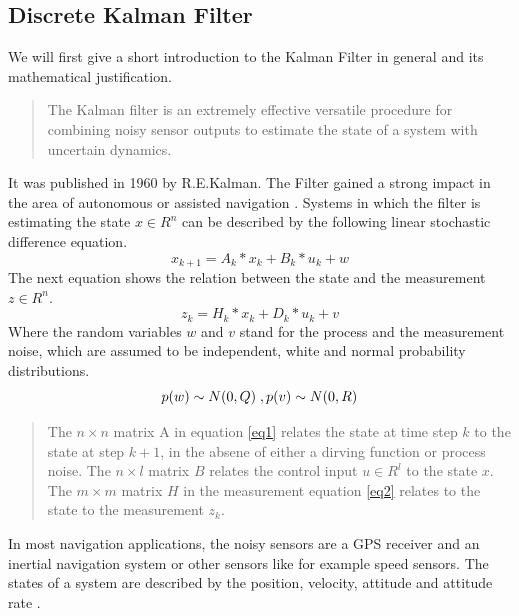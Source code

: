 \subsection*{Discrete Kalman Filter}
We will first give a short introduction to the Kalman Filter in general and its mathematical justification.
\begin{quote}The Kalman filter is an extremely effective versatile procedure for combining noisy sensor outputs to estimate the state of a system with uncertain dynamics.\cite{andrews2007}\end{quote} It was published in 1960 by R.E.Kalman. The Filter gained a strong impact in the area of autonomous or assisted navigation \cite{welch1997}. 
Systems in which the filter is estimating the state $x \in R^{n}$ can be described by the following linear stochastic difference equation.
\begin{equation}
x_{k+1}=A_k*x_k+B_k*u_k+w
\label{eq1}
\end{equation} The next equation shows the relation between the state and the measurement $z \in R^{n}$.
\begin{equation} 
z_k=H_k*x_k+D_k*u_k+v
\label{eq2}
\end{equation}
Where the random variables $w$ and $v$ stand for the process and the measurement noise, which are assumed to be independent, white and normal probability distributions.
\begin{equation}
p(w)\sim N(0,Q)\;, \\
p(v)\sim N(0,R)\label{R_Q_noise}
\end{equation}
\begin{quote}The $n\times n$ matrix A in equation \ref{eq1} relates the state at time step $k$ to the state at step $k+1$, in the absene of either a dirving function or process noise. The $n\times l$ matrix $B$ relates the control input $u \in R^{l}$ to the state $x$. The $m \times m$ matrix $H$ in the measurement equation \ref{eq2} relates to the state to the measurement $z_k$.\cite{welch1997}\end{quote}
In most navigation applications, the noisy sensors are a GPS receiver and an inertial navigation system or other sensors like for example speed sensors. The states of a system are described by the position, velocity, attitude and attitude rate \cite{andrews2007}.

